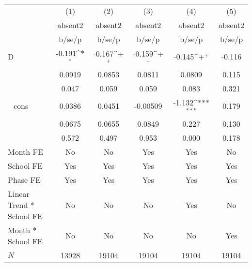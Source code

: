 {
\def\sym#1{\ifmmode^{#1}\else\(^{#1}\)\fi}
\begin{tabular}{l*{5}{c}}
\hline\hline
            &\multicolumn{1}{c}{(1)}&\multicolumn{1}{c}{(2)}&\multicolumn{1}{c}{(3)}&\multicolumn{1}{c}{(4)}&\multicolumn{1}{c}{(5)}\\
            &\multicolumn{1}{c}{absent2}&\multicolumn{1}{c}{absent2}&\multicolumn{1}{c}{absent2}&\multicolumn{1}{c}{absent2}&\multicolumn{1}{c}{absent2}\\
            &      b/se/p         &      b/se/p         &      b/se/p         &      b/se/p         &      b/se/p         \\
\hline
D           &      -0.191\sym{*}  &      -0.167\sym{+}  &      -0.159\sym{+}  &      -0.145\sym{+}  &      -0.116         \\
            &      0.0919         &      0.0853         &      0.0811         &      0.0809         &       0.115         \\
            &       0.047         &       0.059         &       0.059         &       0.083         &       0.321         \\
\_cons      &      0.0386         &      0.0451         &    -0.00509         &      -1.132\sym{***}&       0.179         \\
            &      0.0675         &      0.0655         &      0.0849         &       0.227         &       0.130         \\
            &       0.572         &       0.497         &       0.953         &       0.000         &       0.178         \\
Month FE    &          No         &          No         &         Yes         &         Yes         &          No         \\
School FE   &         Yes         &         Yes         &         Yes         &         Yes         &         Yes         \\
Phase FE    &         Yes         &         Yes         &         Yes         &         Yes         &         Yes         \\
Linear Trend * School FE &          No         &          No         &          No         &         Yes         &          No         \\
Month * School FE &          No         &          No         &          No         &          No         &         Yes         \\
\hline
\(N\)       &       13928         &       19104         &       19104         &       19104         &       19104         \\

\end{tabular}}
